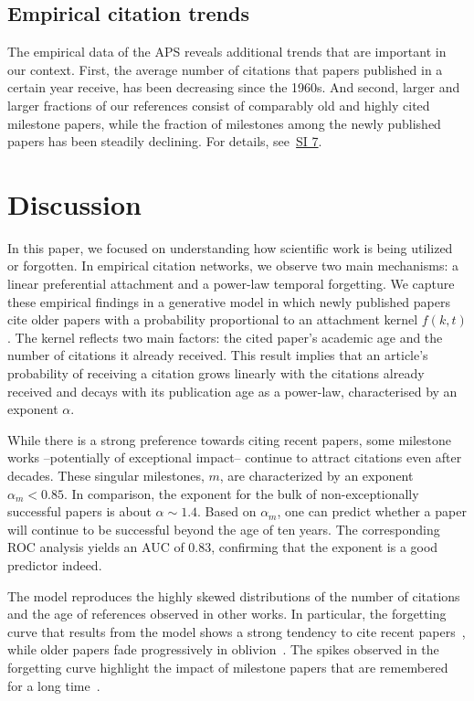 \documentclass[fleqn,10pt]{wlscirep}
\begin{document}
\subsection*{Empirical citation trends}
The empirical data of the APS reveals additional trends that are important in our context. First, the average number of citations that papers published in a certain year receive, has been decreasing since the 1960s. And second, larger and larger fractions of our references consist of comparably old and highly cited milestone papers, while the fraction of milestones among the newly published papers has been steadily declining. For details, see~\hyperref[SI7]{SI 7}.

\section*{Discussion}

In this paper, we focused on understanding how scientific work is being utilized or forgotten. In empirical citation networks, we observe two main mechanisms: a linear preferential attachment and a power-law temporal forgetting. We capture these empirical findings in a generative model in which newly published papers cite older papers with a probability proportional to an attachment kernel $f(k, t)$. The kernel reflects two main factors: the cited paper's academic age and the number of citations it already received. This result implies that an article's probability of receiving a citation grows linearly with the citations already received and decays with its publication age as a power-law, characterised by an exponent $\alpha$.

While there is a strong preference towards citing recent papers, some milestone works --potentially of exceptional impact-- continue to attract citations even after decades. These singular milestones, $m$, are characterized by an exponent $\alpha_m < 0.85$. In comparison, the exponent for the bulk of non-exceptionally successful papers is about  $\alpha \sim 1.4 $. Based on $\alpha_m$, one can predict whether a paper will continue to be successful beyond the age of ten years. The corresponding ROC analysis yields an AUC of $0.83$, confirming that the exponent is a good predictor indeed. 




The model reproduces the highly skewed distributions of the number of citations and the age of references observed in other works. In particular, the forgetting curve that results from the model shows a strong tendency to cite recent papers~\cite{deSollaPrice1965, Burton1960}, while older papers fade progressively in oblivion~\cite{deSollaPrice1965, Redner2005, Burton1960}. The spikes observed in the forgetting curve highlight the impact of milestone papers that are remembered for a long time~\cite{Redner2005, Golosovsky2017}.
\end{document}
